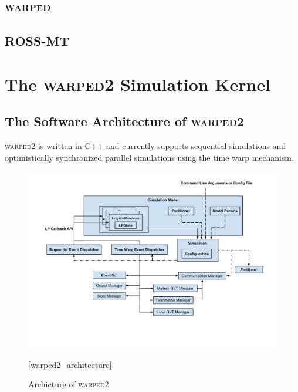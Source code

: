 \documentclass[11pt]{book}
\begin{document}

\section{\textsc{warped}}


\section{ROSS-MT}


\chapter{The \textsc{warped2} Simulation Kernel}\label{warped2_overview}



\section{The Software Architecture of \textsc{warped2}}

\textsc{warped2} is written in C++ and currently supports sequential simulations and optimistically 
synchronized parallel simulations using the time warp mechanism.

\begin{figure}
  \centering
  \includegraphics[width=\textwidth]{figs/warped2.pdf}
  \caption{Archicture of \textsc{warped2}}\ref{warped2_architecture}
\end{figure}
\end{document}
